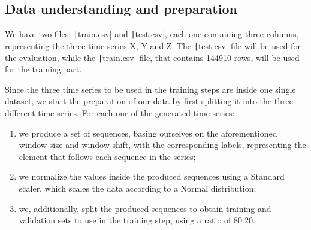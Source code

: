 \documentclass[12pt,a4paper,leqno]{article}
\begin{document}
	\subsection{Data understanding and preparation}
	We have two files, \texttt|train.csv| and \texttt|test.csv|, each one containing three columns, representing the three time series X, Y and Z. The \texttt|test.csv| file will be used for the evaluation, while the \texttt|train.csv| file, that contains 144910 rows, will be used for the training part.
	
	Since the three time series to be used in the training steps are inside one single dataset, we start the preparation of our data by first splitting it into the three different time series. For each one of the generated time series:
	\begin{enumerate}
		\item we produce a set of sequences, basing ourselves on the aforementioned window size and window shift, with the corresponding labels, representing the element that follows each sequence in the series;
		\item we normalize the values inside the produced sequences using a Standard scaler, which scales the data according to a Normal distribution;
		\item we, additionally, split the produced sequences to obtain training and validation sets to use in the training step, using a ratio of 80:20.
	\end{enumerate}
	
\end{document}
